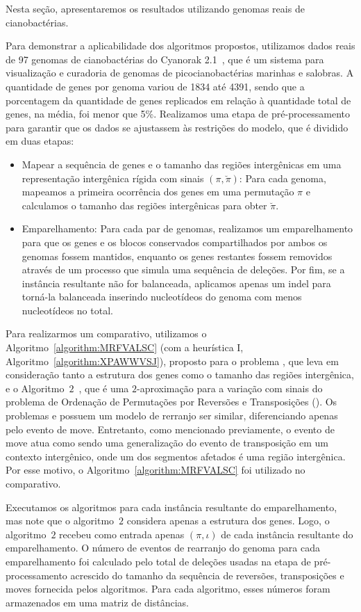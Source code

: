 Nesta seção, apresentaremos os resultados utilizando genomas reais de cianobactérias.

Para demonstrar a aplicabilidade dos algoritmos propostos, utilizamos dados reais de 97 genomas de cianobactérias do Cyanorak 2.1~\cite{cyanorak}, que é um sistema para visualização e curadoria de genomas de picocianobactérias marinhas e salobras. A quantidade de genes por genoma variou de 1834 até 4391, sendo que a porcentagem da quantidade de genes replicados em relação à quantidade total de genes, na média, foi menor que 5\%. Realizamos uma etapa de pré-processamento para garantir que os dados se ajustassem às restrições do modelo, que é dividido em duas etapas:
\begin{itemize}
  \item Mapear a sequência de genes e o tamanho das regiões intergênicas em uma representação intergênica rígida com sinais $(\pi,\breve\pi)$: Para cada genoma, mapeamos a primeira ocorrência dos genes em uma permutação $\pi$ e calculamos o tamanho das regiões intergênicas para obter $\breve\pi$.
  \item Emparelhamento: Para cada par de genomas, realizamos um emparelhamento para que os genes e os blocos conservados compartilhados por ambos os genomas fossem mantidos, enquanto os genes restantes fossem removidos através de um processo que simula uma sequência de deleções. Por fim, se a instância resultante não for balanceada, aplicamos apenas um indel para torná-la balanceada inserindo nucleotídeos do genoma com menos nucleotídeos no total.
\end{itemize}

Para realizarmos um comparativo, utilizamos o Algoritmo~\ref{algorithm:MRFVALSC} (com a heurística I, Algoritmo~\ref{algorithm:XPAWWVSJ}), proposto para o problema \SbIRTM{}, que leva em consideração tanto a estrutura dos genes como o tamanho das regiões intergênica, e o Algoritmo~$2$\SbRT{}~\cite{1998-walter-etal}, que é uma $2$-aproximação para a variação com sinais do problema de Ordenação de Permutações por Reversões e Transposições (\SbRT). Os problemas \SbIRTM{} e \SbRT{} possuem um modelo de rerranjo ser similar, diferenciando apenas pelo evento de move. Entretanto, como mencionado previamente, o evento de move atua como sendo uma generalização do evento de transposição em um contexto intergênico, onde um dos segmentos afetados é uma região intergênica. Por esse motivo, o Algoritmo~\ref{algorithm:MRFVALSC} foi utilizado no comparativo. 

Executamos os algoritmos para cada instância resultante do emparelhamento, mas note que o algoritmo~$2$\SbRT{} considera apenas a estrutura dos genes. Logo, o algoritmo~$2$\SbRT{} recebeu como entrada apenas $(\pi,\iota)$ de cada instância resultante do emparelhamento. O número de eventos de rearranjo do genoma para cada emparelhamento foi calculado pelo total de deleções usadas na etapa de pré-processamento acrescido do tamanho da sequência de reversões, transposições e moves fornecida pelos algoritmos. Para cada algoritmo, esses números foram armazenados em uma matriz de distâncias.

